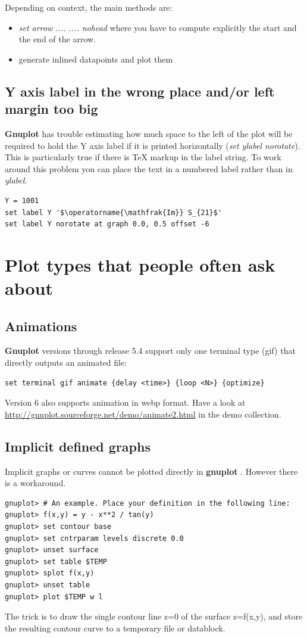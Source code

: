 \documentclass[letter,11pt]{article}
\def\http#1{{\small\href{http://#1}{\url{http://#1}}}}
\newcommand{\http}[1]%
            {\htmladdnormallink{\latex{\url{http://#1}}%
                    \html{\textit{http://#1}}}%
                {http://#1}%
            }
\newcommand{\gnuplot}{\textbf{gnuplot }}
\newcommand{\Gnuplot}{\textbf{Gnuplot }}
\begin{document}
{Depending on context, the main methods are:
\begin{itemize}
\item {\em set arrow .... .... nohead} where you have to compute
explicitly the start and the end of the arrow.
\item generate inlined datapoints and plot them
\end{itemize}

\subsection{Y axis label in the wrong place and/or left margin too big}
\Gnuplot has trouble estimating how much space to the left of the plot
will be required to hold the Y axis label if it is printed horizontally
({\em set ylabel norotate}).  This is particularly true if there is
TeX markup in the label string.  To work around this problem you can place
the text in a numbered label rather than in {\em ylabel}.
\small
\begin{verbatim}
Y = 1001
set label Y '$\operatorname{\mathfrak{Im}} S_{21}$'
set label Y norotate at graph 0.0, 0.5 offset -6
\end{verbatim}
\normalsize

\section{Plot types that people often ask about}

\subsection{Animations}

\Gnuplot versions through release 5.4 support only one terminal type
(gif) that directly outputs an animated file:
\begin{verbatim}
set terminal gif animate {delay <time>} {loop <N>} {optimize}
\end{verbatim}

Version 6 also supports animation in webp format.
Have a look at
\http{gnuplot.sourceforge.net/demo/animate2.html}
in the demo collection.

\subsection{Implicit defined graphs}

Implicit graphs or curves cannot be plotted directly in \gnuplot.
However there is a workaround.
\small
\begin{verbatim}
gnuplot> # An example. Place your definition in the following line:
gnuplot> f(x,y) = y - x**2 / tan(y)
gnuplot> set contour base
gnuplot> set cntrparam levels discrete 0.0
gnuplot> unset surface
gnuplot> set table $TEMP
gnuplot> splot f(x,y)
gnuplot> unset table
gnuplot> plot $TEMP w l
\end{verbatim}
\normalsize
The trick is to draw the single contour line z=0 of the surface
z=f(x,y), and store the resulting contour curve to a temporary file or datablock.


}
\end{document}
